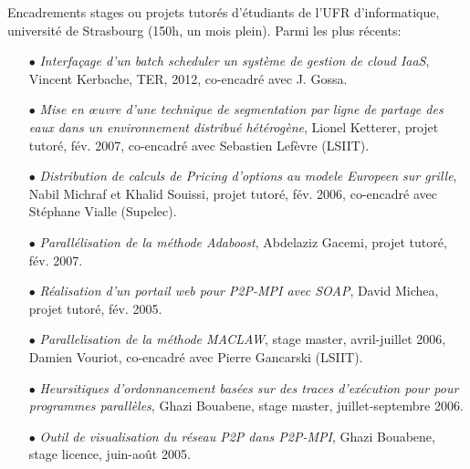 \label{sc:encadre-autres} 
Encadrements stages ou projets tutorés d'étudiants de l'UFR d'informatique, 
université de Strasbourg (150h, un mois plein). Parmi les plus récents:
\smallskip
\begin{itemize}
\item[$\bullet$]  {\it Interfaçage d'un batch scheduler un système de gestion 
de cloud IaaS}, Vincent Kerbache, TER, 2012, co-encadré avec J. Gossa. 
\item[$\bullet$]  {\it Mise en {\oe}uvre d'une technique de segmentation par 
ligne de partage des eaux dans un environnement distribué hétérogène}, 
Lionel Ketterer, projet tutoré, fév. 2007, co-encadré avec Sebastien 
Lefèvre (LSIIT).
\item[$\bullet$]  {\it Distribution de calculs de Pricing d'options au modele 
Europeen sur grille}, Nabil Michraf et Khalid Souissi, projet tutoré, fév. 2006, 
co-encadré avec Stéphane Vialle (Supelec).

\item[$\bullet$]  {\it Parallélisation de la méthode Adaboost}, Abdelaziz 
Gacemi, projet tutoré, fév. 2007.
\item[$\bullet$] {\it Réalisation d'un portail web pour P2P-MPI avec SOAP}, 
David Michea, projet tutoré, fév. 2005.

\item[$\bullet$] {\it Parallelisation de la méthode MACLAW}, stage master, 
avril-juillet 2006, Damien Vouriot, co-encadré avec Pierre Gancarski (LSIIT).
\item[$\bullet$] {\it Heursitiques d'ordonnancement basées sur des traces 
d'exécution pour pour programmes parallèles}, Ghazi Bouabene, stage master, 
juillet-septembre 2006.
\item[$\bullet$]  {\it Outil de visualisation du réseau P2P dans P2P-MPI}, 
Ghazi Bouabene, stage licence, juin-août 2005.
\end{itemize}

